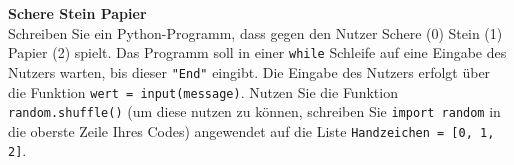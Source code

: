 \textbf{Schere Stein Papier}\\
Schreiben Sie ein Python-Programm, dass gegen den Nutzer Schere (0) Stein (1) Papier (2) spielt. Das Programm soll in einer \verb|while| Schleife auf eine Eingabe des Nutzers warten, bis dieser \verb|"End"| eingibt. Die Eingabe des Nutzers erfolgt über die Funktion \verb|wert = input(message)|. Nutzen Sie die Funktion \verb|random.shuffle()| (um diese nutzen zu können, schreiben Sie \verb|import random| in die oberste Zeile Ihres Codes) angewendet auf die Liste \verb|Handzeichen = [0, 1, 2]|.
